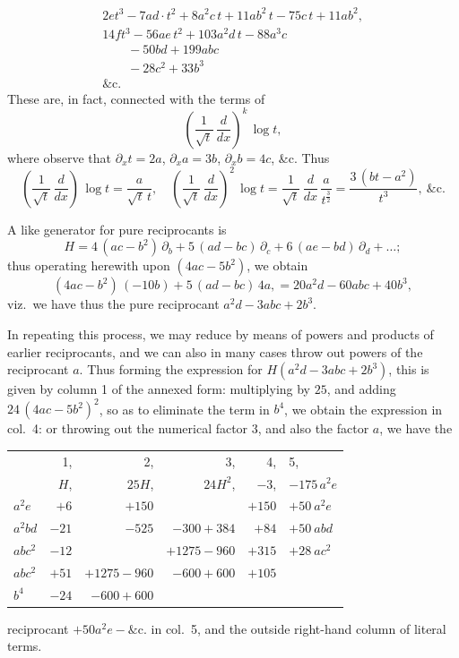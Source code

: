 \documentclass[11pt]{article}
\begin{document}
\[
\begin{array}{l}
2 e t^3 - 7 a d \cdot t^2 + 8 a^2 c\, t + 11 a b^2\, t - 75 c\, t + 11 a b^2, \\
14 f t^3 - 56 a e\, t^2 + 103 a^2 d\, t - 88 a^3 c \\
\quad\quad - 50 b d + 199 a b c \\
\quad\quad - 28 c^2 + 33 b^3 \\
\&\mathrm{c}.
\end{array}
\]
These are, in fact, connected with the terms of
\[
\left(\frac{1}{\sqrt{t}}\,\frac{d}{dx}\right)^k\,\log t,
\]
where observe that $\partial_x t = 2 a$, $\partial_x a = 3 b$, $\partial_x b = 4 c$, \&c. Thus
\[
\left(\frac{1}{\sqrt{t}}\,\frac{d}{dx}\right)\,\log t = \frac{a}{\sqrt{t}\,t},\quad \left(\frac{1}{\sqrt{t}}\,\frac{d}{dx}\right)^2\,\log t = \frac{1}{\sqrt{t}}\,\frac{d}{dx}\,\frac{a}{t^{\tfrac{3}{2}}} = \frac{3\,(b t - a^2)}{t^3},\ \&\mathrm{c}.
\]

A like generator for pure reciprocants is
\[
H = 4\,(a c - b^2)\,\partial_b + 5\,(a d - b c)\,\partial_c + 6\,(a e - b d)\,\partial_d + \ldots;
\]
thus operating herewith upon $(4 a c - 5 b^2)$, we obtain
\[
(4 a c - b^2)\,(-10 b) + 5\,(a d - b c)\,4 a, = 20 a^2 d - 60 a b c + 40 b^3,
\]
viz.\ we have thus the pure reciprocant $a^2 d - 3 a b c + 2 b^3$.

In repeating this process, we may reduce by means of powers and products of earlier reciprocants, and we can also in many cases throw out powers of the reciprocant $a$. Thus forming the expression for $H(a^2 d - 3 a b c + 2 b^3)$, this is given by column 1 of the annexed form: multiplying by $25$, and adding $24\,(4 a c - 5 b^2)^2$, so as to eliminate the term in $b^4$, we obtain the expression in col.\ 4: or throwing out the numerical factor $3$, and also the factor $a$, we have the
\begin{center}
\begin{tabular}{l|r|r|r|r|l}
 & 1, & 2, & 3, & 4, & 5, \\
 & $H$, & $25H$, & $24 H^2$, & $-3$, & $-175\,a^2 e$ \\
\hline
$a^2 e$ & $+6$ & $+150$ & & $+150$ & $+50\ a^2 e$ \\
$a^2 b d$ & $-21$ & $-525$ & $-300+384$ & $+84$ & $+50\ a b d$ \\
$a b c^2$ & $-12$ & & $+1275-960$ & $+315$ & $+28\ a c^2$ \\
$a b c^2$ & $+51$ & $+1275-960$ & $-600+600$ & $+105$ & $\quad$ \\
$b^4$ & $-24$ & $-600+600$ & & & $\quad$ \\
\end{tabular}
\end{center}
reciprocant $+50 a^2 e - \&\mathrm{c}.$ in col.\ 5, and the outside right-hand column of literal terms.
\end{document}
